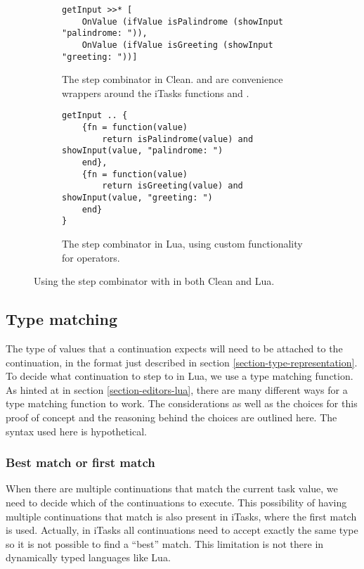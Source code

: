 \begin{figure}[ht]
\begin{subfigure}{\textwidth}
\centering
\begin{verbatim}
getInput >>* [
    OnValue (ifValue isPalindrome (showInput "palindrome: ")),
    OnValue (ifValue isGreeting (showInput "greeting: "))]
\end{verbatim}
\caption{The step combinator in Clean.  and  are convenience wrappers around the iTasks functions  and .}
\label{lst:clean_onvalue_step}
\end{subfigure}
\begin{subfigure}{\textwidth}
\centering
\medskip %
\begin{verbatim}
getInput .. {
    {fn = function(value)
        return isPalindrome(value) and showInput(value, "palindrome: ")
    end},
    {fn = function(value)
        return isGreeting(value) and showInput(value, "greeting: ")
    end}
}
\end{verbatim}
\caption{The step combinator in Lua, using custom functionality for operators.}
\label{lst:lua_onvalue_step}
\end{subfigure}
\caption{Using the step combinator with  in both Clean and Lua.}
\end{figure}

\subsection{Type matching}\label{section-combinators-type-matching}
The type of values that a continuation expects will need to be attached to the continuation, in the format just described in section \ref{section-type-representation}. To decide what continuation to step to in Lua, we use a type matching function. As hinted at in section \ref{section-editors-lua}, there are many different ways for a type matching function to work. The considerations as well as the choices for this proof of concept and the reasoning behind the choices are outlined here. The syntax used here is hypothetical.

\subsubsection{Best match or first match}
When there are multiple continuations that match the current task value, we need to decide which of the continuations to execute. This possibility of having multiple continuations that match is also present in iTasks, where the first match is used. Actually, in iTasks all continuations need to accept exactly the same type so it is not possible to find a ``best'' match. This limitation is not there in dynamically typed languages like Lua.


